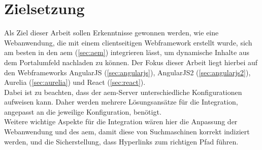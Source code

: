 \section{Zielsetzung}

Als Ziel dieser Arbeit sollen Erkenntnisse gewonnen werden, wie eine Webanwendung, die mit einem clientseitigen Webframework erstellt wurde, sich am besten in den \ac{aem} (\autoref{sec:aem}) integrieren lässt, um dynamische Inhalte aus dem Portalumfeld nachladen zu können. Der Fokus dieser Arbeit liegt hierbei auf den Webframeworks AngularJS (\autoref{sec:angularjs}),  AngularJS2 (\autoref{sec:angularjs2}), Aurelia (\autoref{sec:aurelia}) und React (\autoref{sec:react}).\\
Dabei ist zu beachten, dass der \ac{aem}-Server unterschiedliche Konfigurationen aufweisen kann. Daher werden mehrere Lösungsansätze für die Integration, angepasst an die jeweilige Konfiguration, benötigt. \\
Weitere wichtige Aspekte für die Integration wären hier die Anpassung der Webanwendung und des \ac{aem}, damit diese von Suchmaschinen korrekt indiziert werden, und die Sicherstellung, dass Hyperlinks zum richtigen Pfad führen. \\




